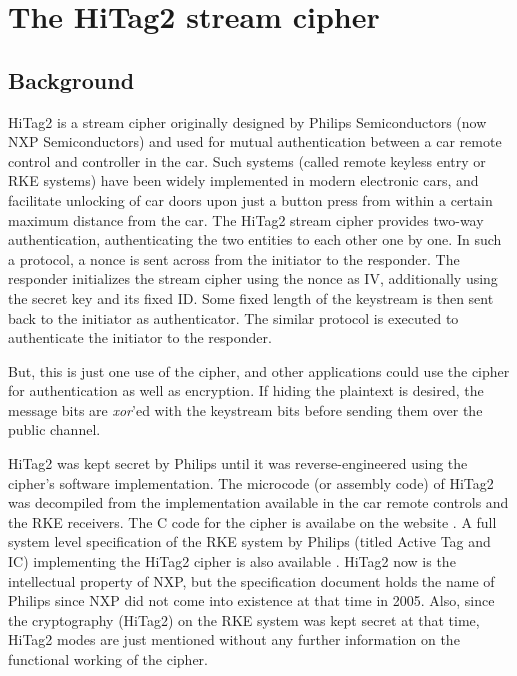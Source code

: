 %
%

\section{The HiTag2 stream cipher}
\label{sec:hitag2}

\subsection{Background}
\label{sec:hitag2-background}
HiTag2 is a stream cipher originally designed by Philips Semiconductors (now NXP Semiconductors) and used for mutual authentication between a car remote control and controller in the car. Such systems (called remote keyless entry or RKE systems) have been widely implemented in modern electronic cars, and facilitate unlocking of car doors upon just a button press from within a certain maximum distance from the car. The HiTag2 stream cipher provides two-way authentication, authenticating the two entities to each other one by one. In such a protocol, a nonce is sent across from the initiator to the responder. The responder initializes the stream cipher using the nonce as IV, additionally using the secret key and its fixed ID. Some fixed length of the keystream is then sent back to the initiator as authenticator. The similar protocol is executed to authenticate the initiator to the responder. 

But, this is just one use of the cipher, and other applications could use the cipher for authentication as well as encryption. If hiding the plaintext is desired, the message bits are \emph{xor}'ed with the keystream bits before sending them over the public channel. 

HiTag2 was kept secret by Philips until it was reverse-engineered using the cipher's software implementation. The microcode (or assembly code) of HiTag2 was decompiled from the implementation available in the car remote controls and the RKE receivers. The C code for the cipher is availabe on the website \cite{hitag2-code}. A full system level specification of the RKE system by Philips (titled Active Tag and IC) implementing the HiTag2 cipher is also available \cite{active-tag-datasheet}. HiTag2 now is the intellectual property of NXP, but the specification document holds the name of Philips since NXP did not come into existence at that time in 2005. Also, since the cryptography (HiTag2) on the RKE system was kept secret at that time, HiTag2 modes are just mentioned without any further information on the functional working of the cipher.

